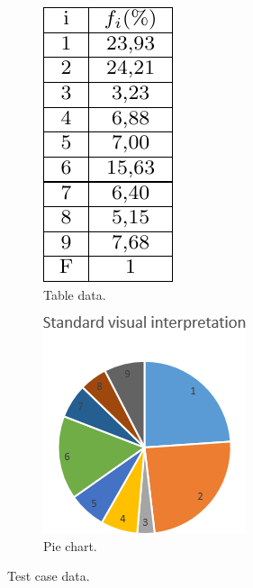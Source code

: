 \documentclass[11pt,leqno]{book}
\begin{document}
\begin{figure}[h!]
\centering
\begin{subfigure}{.5\textwidth}
  \centering
  \includegraphics[width=.4\linewidth]{pic07.png}
  \caption{Table data.}
  \label{fig:sub3}
\end{subfigure}%
\begin{subfigure}{.5\textwidth}
  \centering
  \includegraphics[width=.8\linewidth]{pic02.png}
  \caption{Pie chart.}
  \label{fig:sub4}
\end{subfigure}
\caption{Test case data.}
\label{fig:two}
\end{figure}
\FloatBarrier
\end{document}
